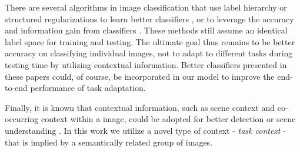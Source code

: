 There are several algorithms in image classification that use label hierarchy or structured regularizations to learn better classifiers \cite{salakhutdinov2011learning,harchaoui2012large,gao2011discriminative}, or to leverage the accuracy and information gain from classifiers \cite{deng2012hedging}. These methods still assume an identical label space for training and testing. The ultimate goal thus remains to be better accuracy on classifying individual images, not to adapt to different tasks during testing time by utilizing contextual information. Better classifiers presented in these papers could, of course, be incorporated in our model to improve the end-to-end performance of task adaptation.

Finally, it is known that contextual information, such as scene context and co-occurring context within a image, could be adopted for better detection \cite{torralba2003contextual} or scene understanding \cite{li2009towards}. In this work we utilize a novel type of context - \emph{task context} - that is implied by a semantically related group of images.


